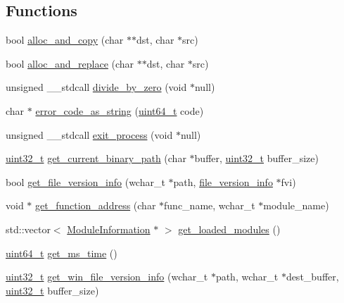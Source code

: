 \subsection*{Functions}
\begin{DoxyCompactItemize}
\item 
bool \hyperlink{utils_8h_a27eebb745f1dafeaf3cd7d9d19674d5a}{alloc\-\_\-and\-\_\-copy} (char $\ast$$\ast$dst, char $\ast$src)
\item 
bool \hyperlink{utils_8h_ab6a93d0b16768a8b1215231998e97a33}{alloc\-\_\-and\-\_\-replace} (char $\ast$$\ast$dst, char $\ast$src)
\item 
unsigned \-\_\-\-\_\-stdcall \hyperlink{utils_8h_af447d208726a022a2c413ca6ae5dc189}{divide\-\_\-by\-\_\-zero} (void $\ast$null)
\item 
char $\ast$ \hyperlink{utils_8h_a138b647135011ac5c1be76ca1ee502b3}{error\-\_\-code\-\_\-as\-\_\-string} (\hyperlink{stdint_8h_aaa5d1cd013383c889537491c3cfd9aad}{uint64\-\_\-t} code)
\item 
unsigned \-\_\-\-\_\-stdcall \hyperlink{utils_8h_a19072a21aa14204c101b56310a053f00}{exit\-\_\-process} (void $\ast$null)
\item 
\hyperlink{stdint_8h_a435d1572bf3f880d55459d9805097f62}{uint32\-\_\-t} \hyperlink{utils_8h_aeed751e935810eb5bfdbcffbb9013c13}{get\-\_\-current\-\_\-binary\-\_\-path} (char $\ast$buffer, \hyperlink{stdint_8h_a435d1572bf3f880d55459d9805097f62}{uint32\-\_\-t} buffer\-\_\-size)
\item 
bool \hyperlink{utils_8h_afb234253fc6ab388ccb09dd11b577ec5}{get\-\_\-file\-\_\-version\-\_\-info} (wchar\-\_\-t $\ast$path, \hyperlink{structfile__version__info}{file\-\_\-version\-\_\-info} $\ast$fvi)
\item 
void $\ast$ \hyperlink{utils_8h_a74f3dd1eda7408b43f7f7fb41465833c}{get\-\_\-function\-\_\-address} (char $\ast$func\-\_\-name, wchar\-\_\-t $\ast$module\-\_\-name)
\item 
std\-::vector$<$ \hyperlink{struct_module_information}{Module\-Information} $\ast$ $>$ \hyperlink{utils_8h_afe432f244cf72a14501d60454fdf4ebf}{get\-\_\-loaded\-\_\-modules} ()
\item 
\hyperlink{stdint_8h_aaa5d1cd013383c889537491c3cfd9aad}{uint64\-\_\-t} \hyperlink{utils_8h_a42ad066921539506df198aebf42ff28d}{get\-\_\-ms\-\_\-time} ()
\item 
\hyperlink{stdint_8h_a435d1572bf3f880d55459d9805097f62}{uint32\-\_\-t} \hyperlink{utils_8h_a9f63a1b8f375c3539db473d7f4be83f0}{get\-\_\-win\-\_\-file\-\_\-version\-\_\-info} (wchar\-\_\-t $\ast$path, wchar\-\_\-t $\ast$dest\-\_\-buffer, \hyperlink{stdint_8h_a435d1572bf3f880d55459d9805097f62}{uint32\-\_\-t} buffer\-\_\-size)

\end{DoxyCompactItemize}
